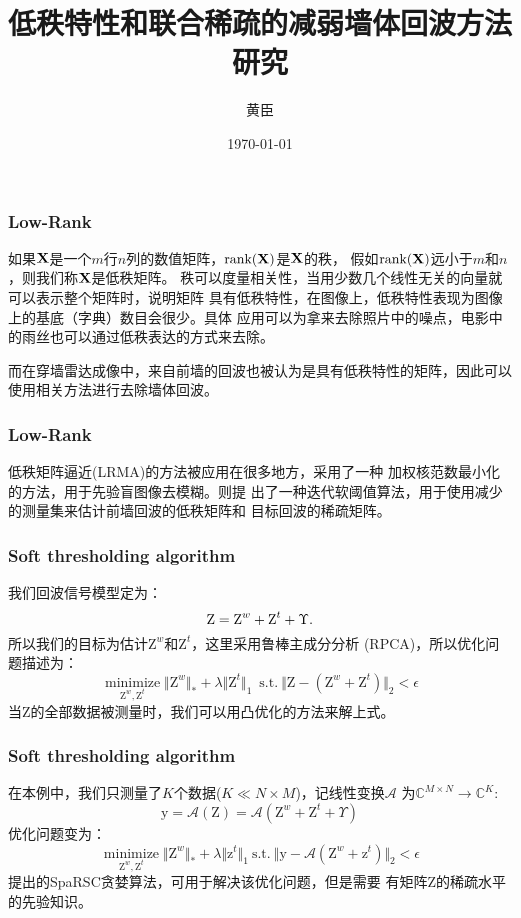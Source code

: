 \documentclass[12pt]{beamer}
\begin{document}
 
\title{低秩特性和联合稀疏的减弱墙体回波方法研究}  
\author{黄臣}  
\date{\today}  
\frame{\titlepage}  
\begin{frame}
  \frametitle{Low-Rank}
  如果$\bf X$是一个$m$行$n$列的数值矩阵，$\rm {rank(}\bf X\rm {)}$是$\bf X$的秩，
  假如$\rm {rank(}\bf X\rm {)}$远小于$m$和$n$，则我们称$\bf X$是低秩矩阵。
  秩可以度量相关性，当用少数几个线性无关的向量就可以表示整个矩阵时，说明矩阵
  具有低秩特性，在图像上，低秩特性表现为图像上的基底（字典）数目会很少。具体
  应用可以为拿来去除照片中的噪点，电影中的雨丝也可以通过低秩表达的方式来去除。

  而在穿墙雷达成像中，来自前墙的回波也被认为是具有低秩特性的矩阵，因此可以
  使用相关方法进行去除墙体回波。
\end{frame}
\begin{frame}
  \frametitle{Low-Rank}
  低秩矩阵逼近(LRMA)的方法被应用在很多地方，\citep{Ren2016Image}采用了一种
  加权核范数最小化的方法，用于先验盲图像去模糊。\citep{Tang2016Radar}则提
  出了一种迭代软阈值算法，用于使用减少的测量集来估计前墙回波的低秩矩阵和
  目标回波的稀疏矩阵。
\end{frame}
\begin{frame}
  \frametitle{Soft thresholding algorithm}
  我们回波信号模型定为：
  \begin{equation} 
	\text{Z}=\text Z^{w}+\text{Z}^{t}+\Upsilon.
  \end{equation}
  所以我们的目标为估计$\text{Z}^w$和$\text{Z}^{t}$，这里采用鲁棒主成分分析
  (RPCA)，所以优化问题描述为：
  \begin{equation} 
	\mathop{\text {minimize}}\limits_{\text{Z}^{w},\text{Z}^{t}} \Vert \text{Z}^{w}\Vert_{*}+\lambda\Vert \text{Z}^{t}\Vert_{1}\ \; \text{s.t}.\ \Vert \text{Z}-(\text{Z}^{w}+\text{Z}^{t})\Vert_{2} < \epsilon 
  \end{equation}
  当$\text{Z}$的全部数据被测量时，我们可以用凸优化的方法来解上式\citep{Chandrasekaran2009Rank}。 
\end{frame}
\begin{frame}
  \frametitle{Soft thresholding algorithm}
  在本例中，我们只测量了$K$个数据($K \ll N \times M$)，记线性变换$\mathcal{A}$
  为$\mathbb{C}^{M\times\!N}\to\mathbb{C}^{K}$:
  \begin{equation*}
	\text{y}=\mathcal{A}(\text{Z})=\mathcal{A}(\text{Z}^{w}+\text{Z}^{t}+\Upsilon)
  \end{equation*}
  优化问题变为：
  \begin{equation}
	\mathop{\text{minimize}}\limits_{\text{Z}^{w},\text{Z}^{t}} \Vert \text{Z}^{w}\Vert_{*}+\lambda\Vert \text{z}^{t}\Vert_{1}\ \text{s.t}.\ \Vert \text{y}-\mathcal{A}(\text{Z}^{w}+\text{z}^{t})\Vert_{2} < \epsilon
  \end{equation}
  \citep{Waters2011SpaRCS}提出的SpaRSC贪婪算法，可用于解决该优化问题，但是需要
  有矩阵$\text{Z}$的稀疏水平的先验知识。
\end{frame}
\end{document}
